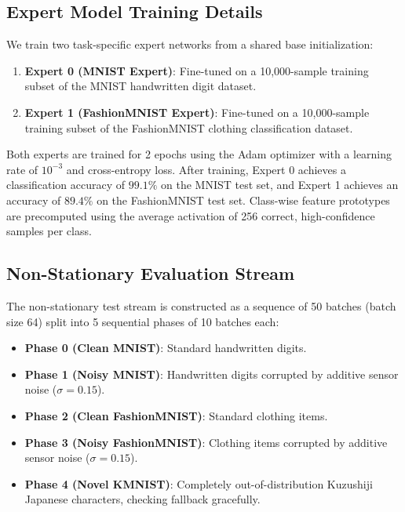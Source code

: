 \documentclass{article}
\begin{document}
\subsection{Expert Model Training Details}
We train two task-specific expert networks from a shared base initialization:
\begin{enumerate}
    \item \textbf{Expert 0 (MNIST Expert)}: Fine-tuned on a 10,000-sample training subset of the MNIST handwritten digit dataset. 
    \item \textbf{Expert 1 (FashionMNIST Expert)}: Fine-tuned on a 10,000-sample training subset of the FashionMNIST clothing classification dataset.
\end{enumerate}
Both experts are trained for 2 epochs using the Adam optimizer with a learning rate of $10^{-3}$ and cross-entropy loss. After training, Expert 0 achieves a classification accuracy of $99.1\%$ on the MNIST test set, and Expert 1 achieves an accuracy of $89.4\%$ on the FashionMNIST test set. Class-wise feature prototypes are precomputed using the average activation of 256 correct, high-confidence samples per class.

\subsection{Non-Stationary Evaluation Stream}
The non-stationary test stream is constructed as a sequence of 50 batches (batch size 64) split into 5 sequential phases of 10 batches each:
\begin{itemize}
    \item \textbf{Phase 0 (Clean MNIST)}: Standard handwritten digits.
    \item \textbf{Phase 1 (Noisy MNIST)}: Handwritten digits corrupted by additive sensor noise ($\sigma = 0.15$).
    \item \textbf{Phase 2 (Clean FashionMNIST)}: Standard clothing items.
    \item \textbf{Phase 3 (Noisy FashionMNIST)}: Clothing items corrupted by additive sensor noise ($\sigma = 0.15$).
    \item \textbf{Phase 4 (Novel KMNIST)}: Completely out-of-distribution Kuzushiji Japanese characters, checking fallback gracefully.
\end{itemize}
\end{document}
